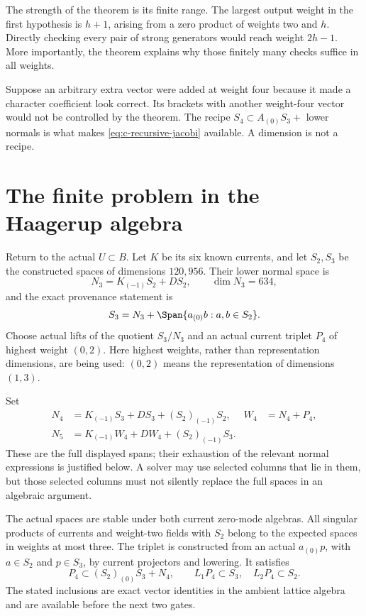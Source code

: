 The strength of the theorem is its finite range. The largest output
weight in the first hypothesis is $h+1$, arising from a zero product
of weights two and $h$. Directly checking every pair of strong
generators would reach weight $2h-1$. More importantly, the theorem
explains why those finitely many checks suffice in all weights.

\begin{remark}
Suppose an arbitrary extra vector were added at weight four because
it made a character coefficient look correct. Its brackets with
another weight-four vector would not be controlled by the theorem.
The recipe $S_4\subset A_{(0)}S_3+$ lower normals is what makes
\eqref{eq:c-recursive-jacobi} available. A dimension is not a recipe.
\end{remark}

\section{The finite problem in the Haagerup algebra}

Return to the actual $U\subset B$. Let $K$ be its six known currents,
and let $S_2,S_3$ be the constructed spaces of dimensions $120,956$.
Their lower normal space is
\[
 N_3=K_{(-1)}S_2+DS_2,\qquad \dim N_3=634,
\]
and the exact provenance statement is
\[
 S_3=N_3+\Span\{a_{(0)}b:a,b\in S_2\}.
\]
Choose actual lifts of the quotient $S_3/N_3$ and an actual current
triplet $P_4$ of highest weight $(0,2)$. Here highest weights, rather
than representation dimensions, are being used: $(0,2)$ means the
representation of dimensions $(1,3)$.

Set
\begin{align}
 N_4&=K_{(-1)}S_3+DS_3+(S_2)_{(-1)}S_2,
 &W_4&=N_4+P_4,\\
 N_5&=K_{(-1)}W_4+DW_4+(S_2)_{(-1)}S_3.
 \label{eq:c-normal-spaces}
\end{align}
These are the full displayed spans; their exhaustion of the relevant
normal expressions is justified below. A solver may use selected
columns that lie in them, but those selected columns must not silently
replace the full spaces in an algebraic argument.

\begin{constructioninput}
The actual spaces are stable under both current zero-mode algebras.
All singular products of currents and weight-two fields with $S_2$
belong to the expected spaces in weights at most three. The triplet
is constructed from an actual $a_{(0)}p$, with $a\in S_2$ and
$p\in S_3$, by current projectors and lowering. It satisfies
\[
 P_4\subset(S_2)_{(0)}S_3+N_4,
 \qquad L_1P_4\subset S_3,\quad L_2P_4\subset S_2.
\]
The stated inclusions are exact vector identities in the ambient
lattice algebra and are available before the next two gates.
\end{constructioninput}


